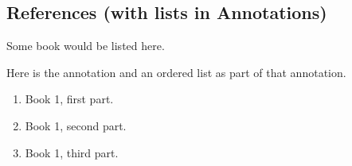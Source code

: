 \documentclass[10pt,]{article}
\theoremstyle{plain}
\theoremstyle{definition}
\theoremstyle{definition}
\theoremstyle{definition}
\theoremstyle{definition}
\theoremstyle{definition}
\theoremstyle{definition}
\numberwithin{equation}{section}
\begin{document}
\subsection[{References (with lists in Annotations)}]{References (with lists in Annotations)}\label{references-2}
\begin{referencelist}
\hypertarget{biblio-undetermined}{}Some book would be listed here. \par\hypertarget{note-3}{}
\hypertarget{p-433}{}%
Here is the annotation and an ordered list as part of that annotation.\leavevmode%
\begin{enumerate}[label=(\alph*)]
\item\hypertarget{li-157}{}Book 1, first part.%
\item\hypertarget{li-158}{}Book 1, second part.%
\item\hypertarget{li-159}{}Book 1, third part.%
\end{enumerate}
%

\end{referencelist}
\typeout{************************************************}
\typeout{************************************************}
\end{document}
